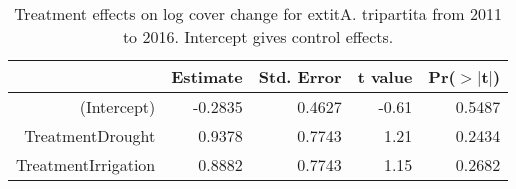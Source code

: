 \begin{table}[ht]
\centering
\caption{Treatment effects on log cover change for 	extit{A. tripartita} from 2011 to 2016. Intercept gives control effects.} 
\label{table:changeARTR}
\begin{tabular}{rrrrr}
  \hline
 & Estimate & Std. Error & t value & Pr($>$$|$t$|$) \\ 
  \hline
(Intercept) & -0.2835 & 0.4627 & -0.61 & 0.5487 \\ 
  TreatmentDrought & 0.9378 & 0.7743 & 1.21 & 0.2434 \\ 
  TreatmentIrrigation & 0.8882 & 0.7743 & 1.15 & 0.2682 \\ 
   \hline
\end{tabular}
\end{table}
